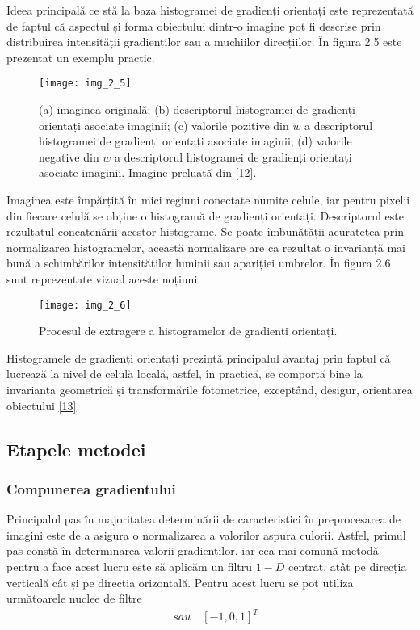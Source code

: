 Ideea principală ce stă la baza histogramei de gradienți orientați este reprezentată de faptul că aspectul și forma obiectului dintr-o imagine pot fi descrise prin distribuirea intensității gradienților sau a muchiilor direcțiilor. În figura 2.5 este prezentat un exemplu practic.
\begin{figure}[!h]
	\centering
	\texttt{[image: img\_2\_5]}
	\caption[Descriptor HOG]{(a) imaginea originală; (b) descriptorul histogramei de gradienți orientați asociate imaginii; (c) valorile pozitive din $w$ a descriptorul histogramei de gradienți orientați asociate imaginii; (d) valorile negative din $w$ a descriptorul histogramei de gradienți orientați asociate imaginii. Imagine preluată din \hyperlink{NavneetDalalBillTriggs}{[12]}.}
\end{figure}

Imaginea este împărțită în mici regiuni conectate numite celule, iar pentru pixelii din fiecare celulă se obține o histogramă de gradienți orientați. Descriptorul este rezultatul concatenării acestor histograme. Se poate îmbunătății acuratețea prin normalizarea histogramelor, această normalizare are ca rezultat o invarianță mai bună a schimbărilor intensităților luminii sau apariției umbrelor. În figura 2.6 sunt reprezentate vizual aceste noțiuni.
\begin{figure}[!h]
	\centering
	\texttt{[image: img\_2\_6]}
	\caption{Procesul de extragere a histogramelor de gradienți orientați.}
\end{figure}

Histogramele de gradienți orientați prezintă principalul avantaj prin faptul că lucrează la nivel de celulă locală, astfel, în practică, se comportă bine la invarianța geometrică și transformările fotometrice, exceptând, desigur, orientarea obiectului \hyperlink{RichardSzeliski}{[13]}. 

\subsection{Etapele metodei}

\subsubsection {Compunerea gradientului}

Principalul pas în majoritatea determinării de caracteristici în preprocesarea de imagini este de a asigura o normalizarea a valorilor aspura culorii. Astfel, primul pas constă în determinarea valorii gradienților, iar cea mai comună metodă pentru a face acest lucru este să aplicăm un filtru $1-D$ centrat, atât pe direcția verticală cât și pe direcția orizontală. Pentru acest lucru se pot utiliza următoarele nuclee de filtre
\begin{align}	
	[-1, 0, 1]  \quad sau  \quad  [-1, 0, 1]^T
\end{align}

